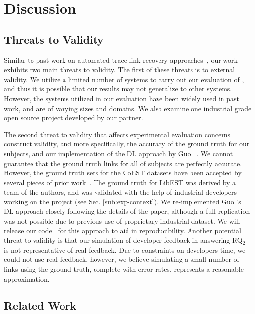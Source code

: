\section{Discussion}
\label{sec:discussion-hbn}

\subsection{Threats to Validity}
\label{sub:threats}
Similar to past work on automated trace link recovery approaches~\citep{Guo:ICSE'17}, our work exhibits two main threats to validity. The first of these threats is to external validity. We utilize a limited number of systems to carry out our evaluation of \Comet, and thus it is possible that our results may not generalize to other systems. However, the systems utilized in our evaluation have been widely used in past work, and are of varying sizes and domains. We also examine one industrial grade open source project developed by our partner.
	
The second threat to validity that affects experimental evaluation concerns construct validity, and more specifically, the accuracy of the ground truth for our subjects, and our implementation of the DL approach by Guo \etal~\citep{Guo:ICSE'17}. We cannot guarantee that the ground truth links for all of subjects are perfectly accurate. However, the ground truth sets for the CoEST datasets have been accepted by several pieces of prior work~\citep{Antoniol:e,Cleland-Huang:TSE'03,Poshyvanyk:TEFSE'11,Gethers:ICSM'11}. The ground truth for LibEST was derived by a team of the authors, and was validated with the help of industrial developers working on the project (see Sec. \ref{sub:exp-context}). We re-implemented Guo \etal's DL approach closely following the details of the paper, although a full replication was not possible due to previous use of  proprietary industrial dataset. We will release our code~\citep{appendix} for this approach to aid in reproducibility. Another potential threat to validity is that our simulation of developer feedback in answering RQ$_2$ is not representative of real feedback. Due to constraints on developers time, we could not use real feedback, however, we believe simulating a small number of links using the ground truth, complete with error rates, represents a reasonable approximation.

\subsection{Related Work}
\label{sub:related-work}

